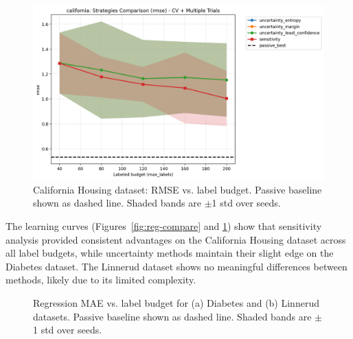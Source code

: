 \documentclass[conference]{IEEEtran}
\begin{document}
\begin{figure}[t]
\centering
\includegraphics[width=0.95\columnwidth]{figures/reg_california_comparison_rmse.png}
\caption{California Housing dataset: RMSE vs. label budget. Passive baseline shown as dashed line. Shaded bands are $\pm$1 std over seeds.}
\label{fig:california-compare}
\end{figure}

The learning curves (Figures~\ref{fig:reg-compare} and \ref{fig:california-compare}) show that sensitivity analysis provided consistent advantages on the California Housing dataset across all label budgets, while uncertainty methods maintain their slight edge on the Diabetes dataset. The Linnerud dataset shows no meaningful differences between methods, likely due to its limited complexity.

\begin{figure}[t]
\centering
{}
\hfill
{}
\caption{Regression MAE vs. label budget for (a) Diabetes and (b) Linnerud datasets. Passive baseline shown as dashed line. Shaded bands are $\pm$1 std over seeds.}
\label{fig:reg-mae-compare}
\end{figure}
\end{document}
